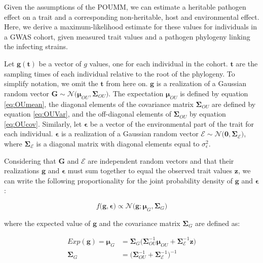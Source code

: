 \documentclass[11pt]{article}
\begin{document}
\begin{linenumbers}
Given the assumptions of the POUMM, we can estimate a heritable pathogen effect on a trait and a corresponding non-heritable, host and environmental effect. Here, we derive a maximum-likelihood estimate for these values for individuals in a GWAS cohort, given measured trait values and a pathogen phylogeny linking the infecting strains.

Let $\bm{g}(\bm{t})$ be a vector of $g$ values, one for each individual in the cohort. $\bm{t}$ are the sampling times of each individual relative to the root of the phylogeny. To simplify notation, we omit the $\bm{t}$ from here on. $\bm{g}$ is a realization of a Gaussian random vector $\bm{G} \sim \mathcal{N}\big(\bm{\mu}_{OU}, \boldsymbol{\Sigma}_{OU}\big)$. The expectation $\bm{\mu}_{OU}$ is defined by equation \ref{eq:OUmean}, the diagonal elements of the covariance matrix $\boldsymbol{\Sigma}_{OU}$ are defined by equation \ref{eq:OUVar}, and the off-diagonal elements of $\boldsymbol{\Sigma}_{OU}$ by equation \ref{eq:OUcov}. Similarly, let $\bm{\epsilon}$ be a vector of the environmental part of the trait for each individual.  $\bm{\epsilon}$ is a realization of a Gaussian random vector $\bm{\mathcal{E}} \sim \mathcal{N}\big(\bm{0}, \boldsymbol{\Sigma}_\mathcal{E}\big)$, where $\boldsymbol{\Sigma}_\mathcal{E}$ is a diagonal matrix with diagonal elements equal to $\sigma^2_\epsilon$.

Considering that $\bm{G}$ and $\bm{\mathcal{E}}$ are independent random vectors and that their realizations $\bm{g}$ and $\bm{\epsilon}$ must sum together to equal the observed trait values $\bm{z}$, we can write the following proportionality for the joint probability density of $\bm{g}$ and $\bm{\epsilon}$:

\begin{equation}
	f\big(\bm{g}, \bm{\epsilon}\big) \propto \mathcal{N}\big(\bm{g}; \bm{\mu}_{G}, \boldsymbol{\Sigma}_G\big)
	\label{eq:pdfGprop}
\end{equation} 

where the expected value of $\bm{g}$ and the covariance matrix $\boldsymbol{\Sigma}_G$ are defined as:

\begin{align}
	Exp(\bm{g}) = \bm{\mu}_{G} &=  \boldsymbol{\Sigma}_G\big(\boldsymbol{\Sigma}_{OU}^{-1}\bm{\mu}_{OU} + \boldsymbol{\Sigma}_\mathcal{E}^{-1} \bm{z}\big) \label{eq:MuG}\\
	\boldsymbol{\Sigma}_G &= \big(\boldsymbol{\Sigma}_{OU}^{-1} + \boldsymbol{\Sigma}_\mathcal{E}^{-1}\big)^{-1} \label{eq:SigmaG}
\end{align}


\end{linenumbers}
\end{document}
